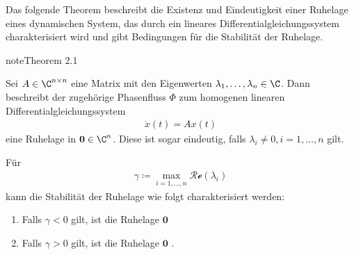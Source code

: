 \documentclass[letterpaper,10pt,english]{jupyterBook}
\begin{document}
\sphinxAtStartPar
Das folgende Theorem beschreibt die Existenz und Eindeutigkeit einer Ruhelage eines dynamischen System, das durch ein lineares Differentialgleichungssystem charakterisiert wird und gibt Bedingungen für die Stabilität der Ruhelage.
\label{odestability/ruhelagen:thm:stablin}
\begin{sphinxadmonition}{note}{Theorem 2.1}



\sphinxAtStartPar
Sei \(A\in \C^{n\times n}\) eine Matrix mit den Eigenwerten \(\lambda_1,\dots, \lambda_n\in \C\).
Dann beschreibt der zugehörige Phasenfluss \(\Phi\) zum homogenen linearen Differentialgleichungssystem
\begin{equation*}
\begin{split}\dot{x}(t) = Ax(t)\end{split}
\end{equation*}
\sphinxAtStartPar
eine Ruhelage in \(\mathbf{0} \in \C^n\).
Diese ist sogar eindeutig, falls \(\lambda_i\neq 0, i=1,\ldots,n\) gilt.

\sphinxAtStartPar
Für
\begin{equation*}
\begin{split}\gamma \coloneqq \max_{i=1,\dots,n} \mathcal{Re}(\lambda_i)\end{split}
\end{equation*}
\sphinxAtStartPar
kann die Stabilität der Ruhelage wie folgt charakterisiert werden:
\begin{enumerate}
%
\item {} 
\sphinxAtStartPar
Falls \(\gamma <0\) gilt, ist die Ruhelage \(\mathbf{0}\) 

\item {} 
\sphinxAtStartPar
Falls \(\gamma >0\) gilt, ist die Ruhelage \(\mathbf{0}\) .

\end{enumerate}
\end{sphinxadmonition}
\end{document}
